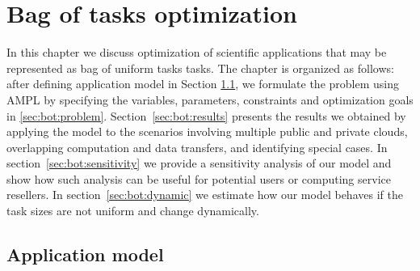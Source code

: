 { %

\newcommand{\INSTANCE}{I}
\newcommand{\STORAGE}{S}
\newcommand{\PROVIDER}{P}
\newcommand{\PROVIDERINSTANCES}{PI}
\newcommand{\LOCALSTORAGE}{LS}

\newcommand{\instancePrice}{p^I}
\newcommand{\ccu}{ccu}
\newcommand{\instanceTransferPriceIn}{p^{Iin}}
\newcommand{\instanceTransferPriceOut}{p^{Iout}}
\newcommand{\storageTransferPriceOut}{p^{Sout}}
\newcommand{\storageTransferPriceIn}{p^{Sin}}
\newcommand{\transferRate}{r}
\newcommand{\totalTasks}{A^{tot}}
\newcommand{\transferTime}{t^{net}}
\newcommand{\execTime}{t^x}
\newcommand{\dataSizeIn}{d^{in}}
\newcommand{\dataSizeOut}{d^{out}}
\newcommand{\requestPrice}{p^{R}}
\newcommand{\deadline}{t^D}
\newcommand{\instanceDeadline}{t^d}
\newcommand{\unitTime}{t^u}
\newcommand{\transferCost}{c^t}
\newcommand{\tasksPerDeadline}{a^d}
\newcommand{\timeQuantum}{t^q}
\newcommand{\tasksPerTimeQuantum}{a^q}
\newcommand{\providerMaxMachines}{n^{Pmax}}
\newcommand{\instanceMaxMachines}{n^{Imax}}

\newcommand{\NumberInstances}{N}
\newcommand{\TaskAssignment}{A}
\newcommand{\DataAssignment}{D}
\newcommand{\TailTaskHours}{R}
\newcommand{\HasTail}{H}

\chapter{Bag of tasks optimization}
\label{chap:bot} 

   In this chapter we discuss optimization of scientific applications that may be represented as bag of uniform tasks tasks. The chapter is organized as follows: after defining application model in Section \ref{sec:bot:appmodel}, we formulate the problem using AMPL by specifying the variables, parameters, constraints and optimization goals in \ref{sec:bot:problem}. Section~\ref{sec:bot:results} presents the results we obtained by applying the model to the scenarios involving multiple public and private clouds, overlapping computation and data transfers, and identifying special cases. In section~\ref{sec:bot:sensitivity} we provide a sensitivity analysis of our model and show how such analysis can be useful for potential users or computing service resellers. In section~\ref{sec:bot:dynamic} we estimate how our model behaves if the task sizes are not uniform and change dynamically.

\section{Application model}
\label{sec:bot:appmodel}

}
